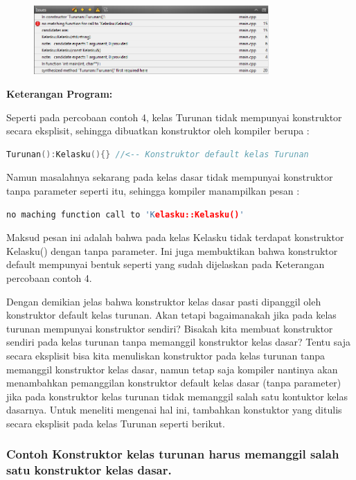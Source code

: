 \begin{figure}[htbp]
\centering
\includegraphics[width=0.8\textwidth]{images/capture7-2.png}

\end{figure}

\textbf{Keterangan Program:}

Seperti pada percobaan contoh 4, kelas Turunan tidak mempunyai
konstruktor secara eksplisit, sehingga dibuatkan konstruktor oleh
kompiler berupa :

\begin{lstlisting}[language=c++, numbers=none]
Turunan():Kelasku(){} //<-- Konstruktor default kelas Turunan
\end{lstlisting}

Namun masalahnya sekarang pada kelas dasar tidak mempunyai konstruktor
tanpa parameter seperti itu, sehingga kompiler manampilkan pesan :

\begin{lstlisting}[language=c++, numbers=none]
no maching function call to 'Kelasku::Kelasku()'
\end{lstlisting}

Maksud pesan ini adalah bahwa pada kelas Kelasku tidak terdapat
konstruktor Kelasku() dengan tanpa parameter. Ini juga membuktikan bahwa
konstruktor default mempunyai bentuk seperti yang sudah dijelaskan pada
Keterangan percobaan contoh 4.

Dengan demikian jelas bahwa konstruktor kelas dasar pasti dipanggil oleh
konstruktor default kelas turunan. Akan tetapi bagaimanakah jika pada
kelas turunan mempunyai konstruktor sendiri? Bisakah kita membuat
konstruktor sendiri pada kelas turunan tanpa memanggil konstruktor kelas
dasar? Tentu saja secara eksplisit bisa kita menuliskan konstruktor pada
kelas turunan tanpa memanggil konstruktor kelas dasar, namun tetap saja
kompiler nantinya akan menambahkan pemanggilan konstruktor default kelas
dasar (tanpa parameter) jika pada konstruktor kelas turunan tidak
memanggil salah satu kontuktor kelas dasarnya. Untuk meneliti mengenai
hal ini, tambahkan konstuktor yang ditulis secara eksplisit pada kelas
Turunan seperti berikut.

\subsubsection*{Contoh Konstruktor kelas turunan harus memanggil salah satu konstruktor kelas dasar.}

